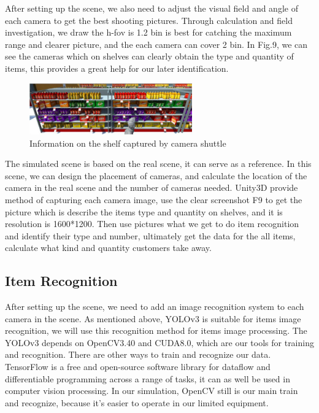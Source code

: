 After setting up the scene, we also need to adjust the visual field and angle of each camera to get the best shooting pictures.
Through calculation and field investigation, we draw the h-fov is 1.2 bin is best for catching the maximum range and clearer picture, and the each camera can cover 2 bin.
In Fig.9, we can see the cameras which on shelves can clearly obtain the type and quantity of items, this provides a great help for our later identification.

\begin{figure}[htbp]
\centerline{\includegraphics[width=7cm,scale=0.8]{shelves.jpg}}
\caption{Information on the shelf captured by camera shuttle}
\label{fig}
\end{figure}

The simulated scene is based on the real scene, it can serve as a reference.
In this scene, we can design the placement of cameras, and calculate the location of the camera in the real scene and the number of cameras needed.
Unity3D provide method of capturing each camera image, use the clear screenshot F9 to get the picture which is describe the items type and quantity on shelves, and it is resolution is 1600*1200.
Then use pictures what we get to do item recognition and identify their type and number, ultimately get the data for the all items, calculate what kind and quantity customers take away.

\subsection{Item Recognition}

After setting up the scene, we need to add an image recognition system to each camera in the scene.
As mentioned above, YOLOv3 is suitable for items image recognition, we will use this recognition method for items image processing.
The YOLOv3 depends on OpenCV3.40 and CUDA8.0, which are our tools for training and recognition.
There are other ways to train and recognize our data.
TensorFlow\cite{199317} is a free and open-source software library for dataflow and differentiable programming across a range of tasks, it can as well be used in computer vision processing.
In our simulation, OpenCV still is our main train and recognize, because it's easier to operate in our limited equipment.

